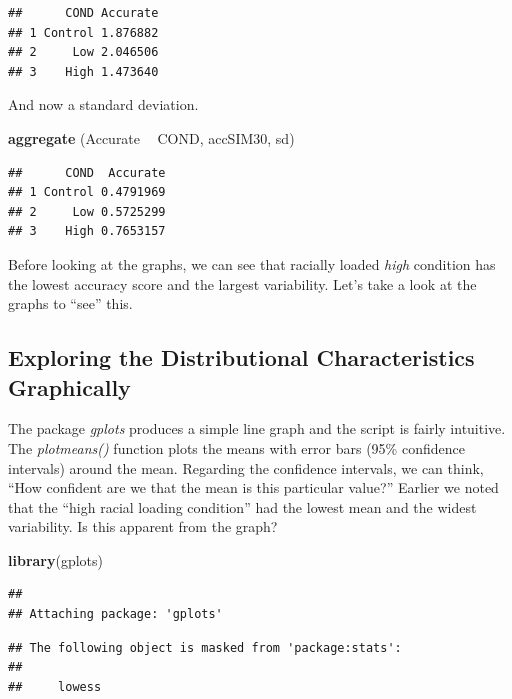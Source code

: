 \documentclass[
  english,
]{book}
\newenvironment{Shaded}{\begin{snugshade}}{\end{snugshade}}
\newcommand{\KeywordTok}[1]{\textcolor[rgb]{0.13,0.29,0.53}{\textbf{#1}}}
\newcommand{\NormalTok}[1]{#1}
\newcommand{\OperatorTok}[1]{\textcolor[rgb]{0.81,0.36,0.00}{\textbf{#1}}}
\newcommand{\StringTok}[1]{\textcolor[rgb]{0.31,0.60,0.02}{#1}}
\begin{document}
\begin{verbatim}
##      COND Accurate
## 1 Control 1.876882
## 2     Low 2.046506
## 3    High 1.473640
\end{verbatim}

And now a standard deviation.

\begin{Shaded}
\begin{Highlighting}[]
\KeywordTok{aggregate}\NormalTok{ (Accurate }\OperatorTok{~}\StringTok{ }\NormalTok{COND, accSIM30, sd)}
\end{Highlighting}
\end{Shaded}

\begin{verbatim}
##      COND  Accurate
## 1 Control 0.4791969
## 2     Low 0.5725299
## 3    High 0.7653157
\end{verbatim}

Before looking at the graphs, we can see that racially loaded \emph{high} condition has the lowest accuracy score and the largest variability. Let's take a look at the graphs to ``see'' this.

\hypertarget{exploring-the-distributional-characteristics-graphically}{%
\subsection{Exploring the Distributional Characteristics Graphically}\label{exploring-the-distributional-characteristics-graphically}}

The package \emph{gplots} produces a simple line graph and the script is fairly intuitive. The \emph{plotmeans()} function plots the means with error bars (95\% confidence intervals) around the mean. Regarding the confidence intervals, we can think, ``How confident are we that the mean is this particular value?'' Earlier we noted that the ``high racial loading condition'' had the lowest mean and the widest variability. Is this apparent from the graph?

\begin{Shaded}
\begin{Highlighting}[]
\KeywordTok{library}\NormalTok{(gplots)}
\end{Highlighting}
\end{Shaded}

\begin{verbatim}
## 
## Attaching package: 'gplots'
\end{verbatim}

\begin{verbatim}
## The following object is masked from 'package:stats':
## 
##     lowess
\end{verbatim}
\end{document}
